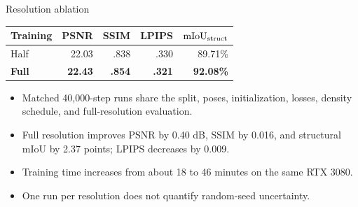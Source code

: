 \documentclass[aspectratio=169,10pt]{beamer}
\begin{document}
\begin{frame}{Resolution ablation}
\begin{center}
\begin{tabular}{lrrrr}\toprule Training&PSNR&SSIM&LPIPS&$\mathrm{mIoU}_{\mathrm{struct}}$\\\midrule Half&22.03&.838&.330&89.71\%\\\textbf{Full}&\textbf{22.43}&\textbf{.854}&\textbf{.321}&\textbf{92.08\%}\\\bottomrule\end{tabular}
\end{center}
\vspace{.5em}\begin{itemize}\tightitems
\item Matched 40,000-step runs share the split, poses, initialization, losses, density schedule, and full-resolution evaluation.
\item Full resolution improves PSNR by 0.40 dB, SSIM by 0.016, and structural mIoU by 2.37 points; LPIPS decreases by 0.009.
\item Training time increases from about 18 to 46 minutes on the same RTX 3080.
\item One run per resolution does not quantify random-seed uncertainty.
\end{itemize}
\end{frame}
\end{document}
